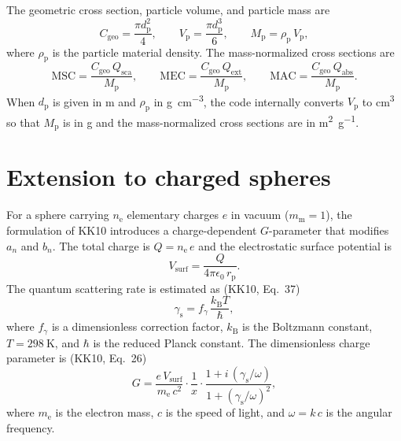 \documentclass[a4paper,11pt]{article}
\begin{document}
The geometric cross section, particle volume, and particle mass are
\begin{equation}
  C_\mathrm{geo} = \frac{\pi d_\mathrm{p}^2}{4},
  \qquad
  V_\mathrm{p} = \frac{\pi d_\mathrm{p}^3}{6},
  \qquad
  M_\mathrm{p} = \rho_\mathrm{p}\, V_\mathrm{p},
  \label{eq:mass-def}
\end{equation}
where $\rho_\mathrm{p}$ is the particle material density.
The mass-normalized cross sections are
\begin{equation}
  \mathrm{MSC} = \frac{C_\mathrm{geo}\, Q_\mathrm{sca}}{M_\mathrm{p}},
  \qquad
  \mathrm{MEC} = \frac{C_\mathrm{geo}\, Q_\mathrm{ext}}{M_\mathrm{p}},
  \qquad
  \mathrm{MAC} = \frac{C_\mathrm{geo}\, Q_\mathrm{abs}}{M_\mathrm{p}}.
  \label{eq:mass-cross-sections}
\end{equation}
When $d_\mathrm{p}$ is given in \si{\meter} and $\rho_\mathrm{p}$ in
\si{\gram\per\cubic\centi\meter}, the code internally converts
$V_\mathrm{p}$ to \si{\cubic\centi\meter} so that
$M_\mathrm{p}$ is in \si{\gram} and the mass-normalized cross sections are in
\si{\meter\squared\per\gram}.


\section{Extension to charged spheres}
\label{sec:charged-sphere}

For a sphere carrying $n_\mathrm{e}$ elementary charges $e$ in vacuum
($m_\mathrm{m} = 1$), the formulation of KK10 introduces a
charge-dependent $G$-parameter that modifies $a_n$ and $b_n$.  The total charge
is $Q = n_\mathrm{e}\, e$ and the electrostatic surface potential is
\begin{equation}
  V_\mathrm{surf} = \frac{Q}{4\pi\epsilon_0\, r_\mathrm{p}}.
  \label{eq:surf-potential}
\end{equation}
The quantum scattering rate is estimated as (KK10, Eq.~37)
\begin{equation}
  \gamma_\mathrm{s} = f_\gamma \,\frac{k_\mathrm{B} T}{\hbar},
  \label{eq:gamma-s}
\end{equation}
where $f_\gamma$ is a dimensionless correction factor, $k_\mathrm{B}$ is the
Boltzmann constant, $T = \SI{298}{\kelvin}$, and $\hbar$ is the reduced Planck
constant.  The dimensionless charge parameter is (KK10, Eq.~26)
\begin{equation}
  G = \frac{e\, V_\mathrm{surf}}{m_\mathrm{e}\, c^2}
      \cdot \frac{1}{x}
      \cdot \frac{1 + i\,(\gamma_\mathrm{s}/\omega)}
                 {1 + (\gamma_\mathrm{s}/\omega)^2},
  \label{eq:g-parameter}
\end{equation}
where $m_\mathrm{e}$ is the electron mass, $c$ is the speed of light, and
$\omega = k\, c$ is the angular frequency.
\end{document}
